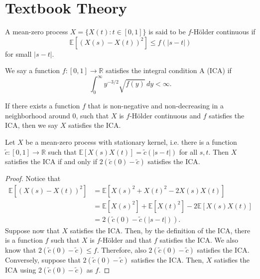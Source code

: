 \section{Textbook Theory}
\label{sec:textbook-theory}


\begin{definition}
    A mean-zero process $X = \{X(t) : t \in [0, 1]\}$ is said to be $f$-H\"older continuous if
    \[
        \mathbb{E}\left[(X(s) - X(t))^2 \right] \leq f(|s - t|)
    \]
    for small $|s-t|$.
\end{definition}


\begin{definition}
    We say a function $f: [0, 1] \to \mathbb{R}$ satisfies the integral condition A (ICA) if
    \[
        \int_0^\infty y^{-3/2} \sqrt{f(y)} \, dy < \infty.
    \]
\end{definition}

\begin{definition}
    If there exists a function $f$ that is non-negative and non-decreasing in a neighborhood around
    0, such that $X$ is $f$-H\"older continuous and $f$ satisfies the ICA, then we say $X$ satisfies
    the ICA.
\end{definition}


\begin{proposition}\label{prop:ica-symmetric-kernel}
    Let $X$ be a mean-zero process with stationary kernel, i.e. there is a function $\tilde{c} : [0,
    1] \to \mathbb{R}$ such that $\mathbb{E}[X(s) X(t)] = \tilde{c}(|s - t|)$ for all $s, t$. Then
    $X$ satisfies the ICA if and only if $2 (\tilde{c}(0) - \tilde{c})$ satisfies the ICA.
\end{proposition}
\begin{proof}
    Notice that
    \begin{align}
        \mathbb{E}\left[(X(s) - X(t))^2\right]
        &= \mathbb{E}\left[X(s)^2 + X(t)^2 - 2 X(s) X(t)\right] \\
        &= \mathbb{E}[X(s)^2] + \mathbb{E}[X(t)^2] - 2 \mathbb{E}[X(s) X(t)] \\
        &= 2 (\tilde{c}(0) - \tilde{c}(|s - t|)).
    \end{align}
    Suppose now that $X$ satisfies the ICA. Then, by the definition of the ICA, there is a function
    $f$ such that $X$ is $f$-H\"older and that $f$ satisfies the ICA. We also know that $2
    (\tilde{c}(0) - \tilde{c}) \leq f$. Therefore, also $2 (\tilde{c}(0) - \tilde{c})$ satisfies the
    ICA. Conversely, suppose that $2 (\tilde{c}(0) - \tilde{c})$ satisfies the ICA. Then, $X$
    satisfies the ICA using $2 (\tilde{c}(0) - \tilde{c})$ as $f$.
\end{proof}


